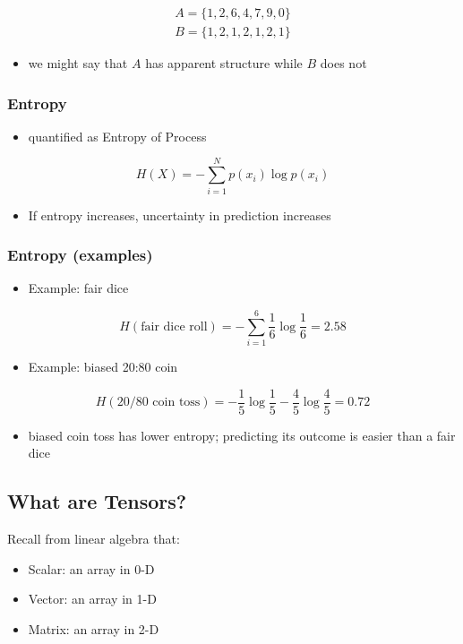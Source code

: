 \documentclass[11pt]{article}
\begin{document}
\begin{align*}
A = \{1, 2, 6, 4, 7, 9, 0\} \\
B = \{1, 2, 1, 2, 1, 2, 1\}
\end{align*}

\begin{itemize}
\item we might say that \(A\) has apparent structure while \(B\) does not
\end{itemize}

\subsubsection*{Entropy}
\label{sec:org5e1befa}
\begin{itemize}
\item quantified as Entropy of Process
\end{itemize}
$$H(X) = -\sum_{i=1}^{N} p(x_i) \log p(x_i)$$
\begin{itemize}
\item If entropy increases, uncertainty in prediction increases
\end{itemize}
\subsubsection*{Entropy (examples)}
\label{sec:orgcf12476}
\begin{itemize}
\item Example: fair dice
\end{itemize}
$$H(\text{fair dice roll}) = -\sum_{i=1}^6 \frac{1}{6} \log \frac{1}{6}=2.58$$
\begin{itemize}
\item Example: biased 20:80 coin
\end{itemize}
$$H(20/80 \text{ coin toss}) = -\frac{1}{5}\log \frac{1}{5}-\frac{4}{5}\log \frac{4}{5} = 0.72$$
\begin{itemize}
\item biased coin toss has lower entropy; predicting its outcome is easier than a fair dice
\end{itemize}
\subsection*{What are Tensors?}
\label{sec:org1a7df10}
Recall from linear algebra that:
\begin{itemize}
\item Scalar: an array in 0-D
\item Vector: an array in 1-D
\item Matrix: an array in 2-D
\end{itemize}
\end{document}
